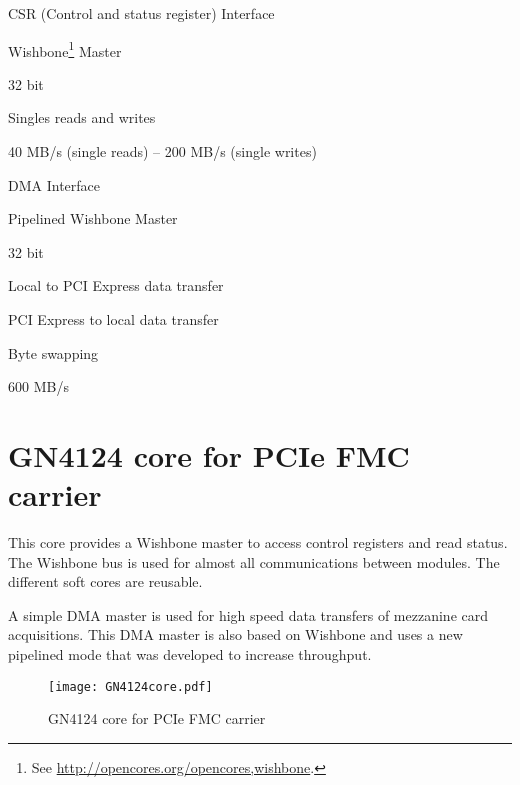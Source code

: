 \documentclass[10pt,a4paper]{cerndoc}
\begin{document}
\begin{packed_item}
  \item CSR (Control and status register) Interface 
  \begin{packed_item}
    \item Wishbone\footnote{See \href{http://opencores.org/opencores,wishbone}{http://opencores.org/opencores,wishbone}.} Master
  	\item 32 bit  
  	\item Singles reads and writes 
  	\item 40 MB/s (single reads) -- 200 MB/s (single writes)
   \end{packed_item}  
  
  \item DMA Interface 
  \begin{packed_item}
    \item Pipelined Wishbone Master
  	\item 32 bit  
  	\item Local to PCI Express data transfer
  	\item PCI Express to local data transfer
  	\item Byte swapping
  	\item 600 MB/s 
   \end{packed_item}     
   


\end{packed_item}

  \section{GN4124 core for PCIe FMC carrier}
  This core provides a Wishbone master to access control registers and read status.  The Wishbone bus is used for almost all communications between modules. The different soft cores are reusable.
  
  A simple DMA master is used for high speed data transfers of mezzanine card acquisitions. This DMA master is also based on Wishbone and uses a new pipelined mode that was developed to increase  throughput.
  
\begin{figure}[!ht]
	\centering
		\texttt{[image: GN4124core.pdf]}
	\caption{GN4124 core for PCIe FMC carrier}
	\label{fig:GN4124core}
\end{figure} 
\end{document}
